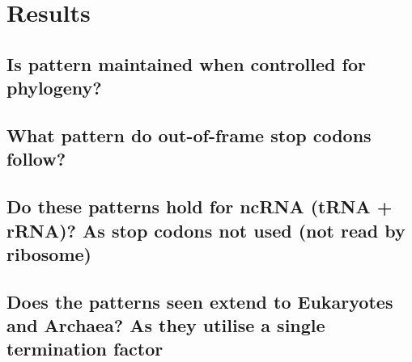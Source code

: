 \documentclass[../main.tex]{subfile}
\begin{document}
 \section{Results}
    \subsection{Is pattern maintained when controlled for phylogeny?}
    \subsection{What pattern do out-of-frame stop codons follow?}
    \subsection{Do these patterns hold for ncRNA (tRNA + rRNA)?
                As stop codons not used (not read by ribosome)}
    \subsection{Does the patterns seen extend to Eukaryotes and Archaea?
                As they utilise a single termination factor}
\end{document}
